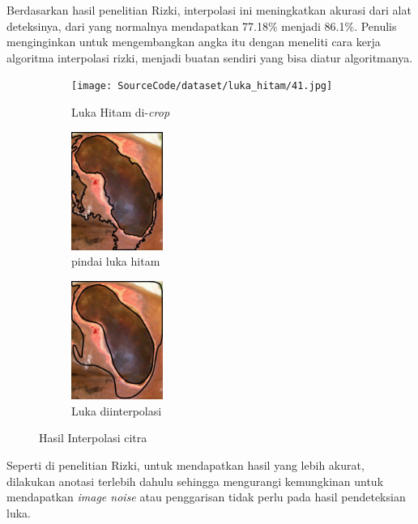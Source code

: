 Berdasarkan hasil penelitian Rizki, interpolasi ini 
meningkatkan akurasi dari alat deteksinya, dari yang 
normalnya mendapatkan 77.18\% menjadi 86.1\%. Penulis 
menginginkan untuk mengembangkan angka itu dengan meneliti 
cara kerja algoritma interpolasi rizki, menjadi buatan sendiri 
yang bisa diatur algoritmanya.

\begin{figure}[H]
	\centering
	\begin{subfigure}{.3\textwidth}
		\centering
		\texttt{[image: SourceCode/dataset/luka\_hitam/41.jpg]}
		\caption{Luka Hitam di-\textit{crop}}
	\end{subfigure}
	\begin{subfigure}{.3\textwidth}
		\centering
		\includegraphics[keepaspectratio, width=3cm]{gambar/Bab3Extra/LukaHitamBorderFollowing.jpg}
		\caption{pindai luka hitam}
	\end{subfigure} 
	\begin{subfigure}{.3\textwidth}
		\centering
		\includegraphics[keepaspectratio, width=3cm]{gambar/Bab3Extra/LukaHitamCurve.jpg}
		\caption{Luka diinterpolasi}
	\end{subfigure}
	\caption{Hasil Interpolasi citra}
\end{figure}

Seperti di penelitian Rizki, untuk mendapatkan hasil yang lebih 
akurat, dilakukan anotasi terlebih dahulu sehingga mengurangi 
kemungkinan untuk mendapatkan \textit{image noise} atau penggarisan 
tidak perlu pada hasil pendeteksian luka. 

